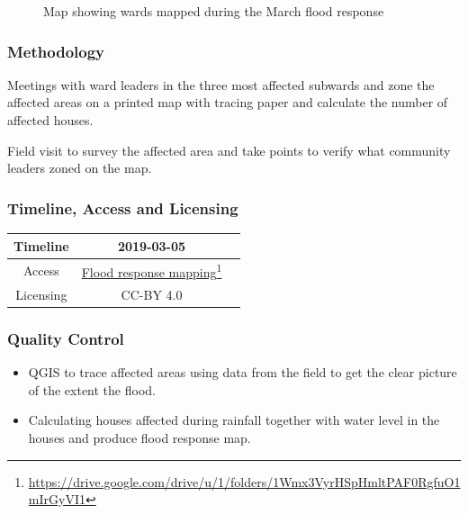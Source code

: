 \documentclass[a4paper,12pt,twoside]{article}
\begin{document}
\begin{figure}[h]
  \color{RHgreen}\caption{Map showing wards mapped during the March flood response}
  \centering
\end{figure}

\subsubsection{Methodology}
Meetings with ward leaders in the three most affected subwards and zone the affected areas on a printed map with tracing paper and calculate the number of affected houses.

Field visit to survey the affected area and take points to verify what community leaders zoned on the map.

\subsubsection{Timeline, Access and Licensing}
\begin{center}
\begin{tabular}{|c|c|c|}  
 \hline
  Timeline  &  2019-03-05 \\
\hline  
 Access  & 
   \href{https://drive.google.com/drive/u/1/folders/1Wmx3VyrHSpHmltPAF0RgfuO1mIrGyVI1}{Flood response mapping}\footnote{\url{https://drive.google.com/drive/u/1/folders/1Wmx3VyrHSpHmltPAF0RgfuO1mIrGyVI1}} \\
  
\hline
Licensing   &  CC-BY 4.0 \\
\hline

\end{tabular}
\end{center}

\subsubsection{Quality Control}
\begin{itemize}
    \item QGIS to trace affected areas using data from the field to get the clear picture of the extent the flood. 
   \item Calculating houses affected during rainfall together with  water level in the houses  and produce flood response map.
\end{itemize}
\end{document}
